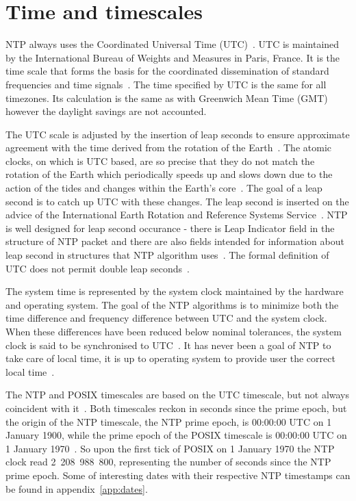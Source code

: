 
\section{Time and timescales}\label{sec:ntp-time}
NTP always uses the Coordinated Universal Time (UTC)~\cite{rfc5905}.
UTC is maintained by the International Bureau of Weights and Measures in Paris, France.
It is the time scale that forms the basis for the coordinated dissemination
of standard frequencies and time signals~\cite{bipm-utc}.
The time specified by UTC is the same for all timezones.
Its calculation is the same as with Greenwich Mean Time (GMT) however
the daylight savings are not accounted.

The UTC scale is adjusted by the insertion of leap seconds to ensure approximate
agreement with the time derived from the rotation of the Earth~\cite{bipm-utc}.
The atomic clocks, on which is UTC based, are so precise that
they do not match the rotation of the Earth
which periodically speeds up and slows down due to the action
of the tides and changes within the Earth's core~\cite{cnn-earth}.
The goal of a leap second is to catch up UTC with these changes.
The leap second is inserted on the advice of the International Earth Rotation and Reference Systems Service~\cite{bipm-utc}.
NTP is well designed for leap second occurance -
there is Leap Indicator field
in the structure of NTP packet and there are also fields intended for
information about leap second in structures that NTP algorithm uses~\cite{rfc5905}.
The formal definition of UTC does not permit double leap seconds~\cite{posix}.

The system time is represented by the system clock maintained by
the hardware and operating system.
The goal of the NTP algorithms is to minimize
both the time difference and frequency difference between UTC and the system clock.
When these differences have been reduced below nominal
tolerances, the system clock is said to be synchronised to UTC~\cite{rfc5905}.
It has never been a goal of NTP to take care of local time,
it is up to operating system to provide user the correct local time~\cite{ntp-overview}.

The NTP and POSIX timescales are based on the UTC timescale,
but not always coincident with it~\cite{ntp-leap}.
Both timescales reckon in seconds since the prime epoch,
but the origin of the NTP timescale, the NTP prime epoch, is 00:00:00 UTC on 1 January 1900,
while the prime epoch of the POSIX timescale is 00:00:00 UTC on 1 January 1970~\cite{ntp-leap}.
So upon the first tick of POSIX on 1 January 1970 the NTP clock read 2~208~988~800,
representing the number of seconds since the NTP prime epoch.
Some of interesting dates with their respective NTP timestamps
can be found in appendix~\ref{app:dates}.
